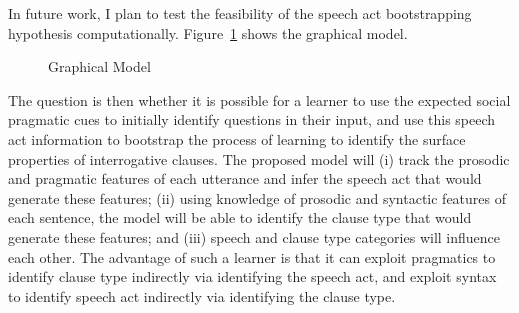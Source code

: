 In future work, I plan to test the feasibility of the speech act bootstrapping hypothesis computationally. Figure~\ref{fg:model} shows the graphical model. 
  
\begin{figure}[H]
\centering
{}
\caption{Graphical Model}\label{fg:model}
\end{figure}

The question is then whether it is possible for a learner to use the expected social pragmatic cues to initially identify questions in their input, and use this speech act information to bootstrap the process of learning to identify the surface properties of interrogative clauses. The proposed model will (i) track the prosodic and pragmatic features of each utterance and infer the speech act that would generate these features; (ii) using knowledge of prosodic and syntactic features of each sentence, the model will be able to identify the clause type that would generate these features; and (iii) speech and clause type categories will influence each other. The advantage of such a learner is that it can exploit pragmatics to identify clause type indirectly via identifying the speech act, and exploit syntax to identify speech act indirectly via identifying the clause type. 

